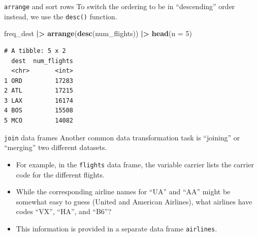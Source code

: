 \documentclass[
  ignorenonframetext,
]{beamer}
\newenvironment{Shaded}{\begin{snugshade}}{\end{snugshade}}
\newcommand{\AttributeTok}[1]{\textcolor[rgb]{0.13,0.29,0.53}{#1}}
\newcommand{\DecValTok}[1]{\textcolor[rgb]{0.00,0.00,0.81}{#1}}
\newcommand{\FunctionTok}[1]{\textcolor[rgb]{0.13,0.29,0.53}{\textbf{#1}}}
\newcommand{\NormalTok}[1]{#1}
\newcommand{\SpecialCharTok}[1]{\textcolor[rgb]{0.81,0.36,0.00}{\textbf{#1}}}
\begin{document}
\begin{frame}[fragile]{\texttt{arrange} and sort rows}
\protect\hypertarget{arrange-and-sort-rows-3}{}
To switch the ordering to be in ``descending'' order instead, we use the
\texttt{desc()} function.

\normalsize

\begin{Shaded}
\begin{Highlighting}[]
\NormalTok{freq\_dest }\SpecialCharTok{|\textgreater{}} 
  \FunctionTok{arrange}\NormalTok{(}\FunctionTok{desc}\NormalTok{(num\_flights)) }\SpecialCharTok{|\textgreater{}} 
  \FunctionTok{head}\NormalTok{(}\AttributeTok{n =} \DecValTok{5}\NormalTok{)}
\end{Highlighting}
\end{Shaded}

\begin{verbatim}
# A tibble: 5 x 2
  dest  num_flights
  <chr>       <int>
1 ORD         17283
2 ATL         17215
3 LAX         16174
4 BOS         15508
5 MCO         14082
\end{verbatim}

\normalsize
\end{frame}

\begin{frame}[fragile]{\texttt{join} data frames}
\protect\hypertarget{join-data-frames}{}
Another common data transformation task is ``joining'' or ``merging''
two different datasets.

\begin{itemize}
\item
  For example, in the \texttt{flights} data frame, the variable carrier
  lists the carrier code for the different flights.
\item
  While the corresponding airline names for ``UA'' and ``AA'' might be
  somewhat easy to guess (United and American Airlines), what airlines
  have codes ``VX'', ``HA'', and ``B6''?
\item
  This information is provided in a separate data frame
  \texttt{airlines}.
\end{itemize}
\end{frame}
\end{document}
